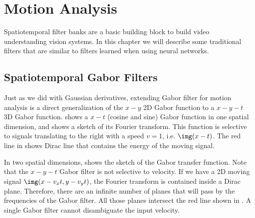 



%


\section{Motion Analysis}

Spatiotemporal filter banks are a basic building block to build video understanding vision systems. In this chapter we will describe some traditional filters that are similar to filters learned when using neural networks.  

\subsection{Spatiotemporal Gabor Filters}




Just as we did with Gaussian derivatives, extending Gabor filter for motion analysis is a direct generalization of the $x-y$ 2D Gabor function to a $x-y-t$ 3D Gabor function.  shows a $x-t$ (cosine and sine) Gabor function in one spatial dimension, and   shows a sketch of its Fourier transform. This function is selective to signals translating to the right with a speed $v=1$, i.e. $\img (x-t)$. The red line in  shows Dirac line that contains the energy of the moving signal. 

In two spatial dimensions,  shows the sketch of the Gabor transfer function. Note that the $x-y-t$ Gabor filter is not selective to velocity. If we have a 2D moving signal $\img (x-v_xt, y-v_yt)$, the Fourier transform is contained inside a Dirac plane. Therefore, there are an infinite number of planes that will pass by the frequencies of the Gabor filter. All those planes intersect the red line shown in . A single Gabor filter cannot disambiguate the input velocity. 

